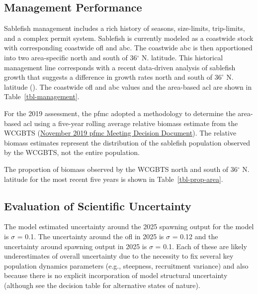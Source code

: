 \documentclass[
  english,
]{article}
\begin{document}
\subsection{Management Performance}\label{management-performance-1}

Sablefish management includes a rich history of seasons, size-limits,
trip-limits, and a complex permit system. Sablefish is currently modeled
as a coastwide stock with corresponding coastwide \gls{ofl} and
\gls{abc}. The coastwide \gls{abc} is then apportioned into two
area-specific  north and south of 36\(^\circ\) N.
latitude. This historical management line corresponds with a recent
data-driven analysis of sablefish growth that suggests a difference in
growth rates north and south of \(36^\circ\) N. latitude
(). The
coastwide \gls{ofl} and \gls{abc} values and the area-based \gls{acl}
are shown in Table~\ref{tbl-management}.

For the 2019 assessment, the \gls{pfmc} adopted a methodology to
determine the area-based \gls{acl} using a five-year rolling average
relative biomass estimate from the WCGBTS
(\href{https://www.pcouncil.org/documents/2019/11/november-2019-decision-document.pdf/}{November
2019 \gls{pfmc} Meeting Decision Document}). The relative biomass
estimates represent the distribution of the sablefish population
observed by the WCGBTS, not the entire population.

The proportion of biomass observed by the WCGBTS north and south of
36\(^\circ\) N. latitude for the most recent five years is shown in
Table~\ref{tbl-prop-area}.

\subsection{Evaluation of Scientific
Uncertainty}\label{evaluation-of-scientific-uncertainty-1}

The model estimated uncertainty around the 2025 spawning output for the
model is \(\sigma\) = 0.1. The uncertainty around the \gls{ofl} in 2025
is \(\sigma\) = 0.12 and the uncertainty around spawning output in 2025
is \(\sigma\) = 0.1. Each of these are likely underestimates of overall
uncertainty due to the necessity to fix several key population dynamics
parameters (e.g., steepness, recruitment variance) and also because
there is no explicit incorporation of model structural uncertainty
(although see the decision table for alternative states of nature).
\end{document}
